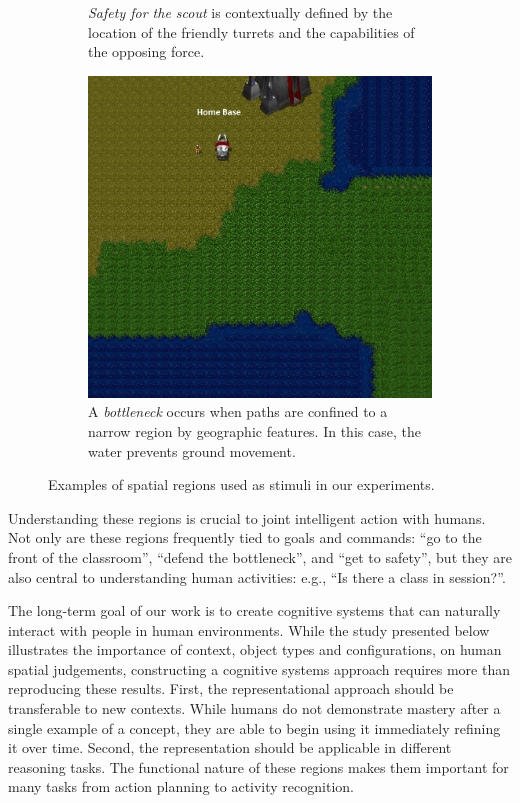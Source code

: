\documentclass[11pt,letterpaper]{article}
\begin{document}
\begin{figure}
\begin{subfigure}[b]{0.3\textwidth}
  \caption{\textit{Safety for the scout} is contextually defined by the location of the friendly turrets and the capabilities of the opposing force.}
\end{subfigure}
\begin{subfigure}[b]{0.3\textwidth}
  \includegraphics[width=\textwidth]{figures/bottleneck.JPG}
  \caption{A \textit{bottleneck} occurs when paths are confined to a narrow region by geographic features.  In this case, the water prevents ground movement.}
  \label{fig:safety}
  \end{subfigure}
  
  \caption{Examples of spatial regions used as stimuli in our experiments.}
  \label{fig:examples}
\end{figure}

Understanding these regions is crucial to joint intelligent action with humans.  Not only are these regions frequently tied to goals and commands: ``go to the front of the classroom'', ``defend the bottleneck'', and ``get to safety'', but they are also central to understanding human activities: e.g., ``Is there a class in session?''.

The long-term goal of our work is to create cognitive systems that can naturally interact with people in human environments.  While the study presented below illustrates the importance of context, object types and configurations, on human spatial judgements, constructing a cognitive systems approach requires more than reproducing these results.  First, the representational approach should be transferable to new contexts.  While humans do not demonstrate mastery after a single example of a concept, they are able to begin using it immediately refining it over time.  Second, the representation should be applicable in different reasoning tasks.  The functional nature of these regions makes them important for many tasks from action planning to activity recognition.
\end{document}
